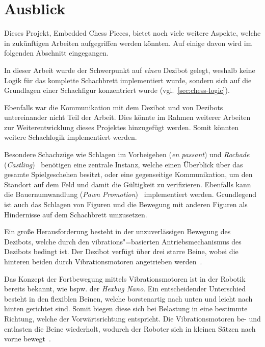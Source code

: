 
\section{Ausblick}
\label{sec:perspective}

Dieses Projekt, Embedded Chess Pieces, bietet noch viele weitere Aspekte, welche in zukünftigen Arbeiten aufgegriffen werden könnten. Auf einige davon wird im folgenden Abschnitt eingegangen.


In dieser Arbeit wurde der Schwerpunkt auf \emph{einen} Dezibot gelegt, weshalb keine Logik für das komplette Schachbrett implementiert wurde, sondern sich auf die Grundlagen einer Schachfigur konzentriert wurde (vgl.~\autoref{sec:chess-logic}).


Ebenfalls war die Kommunikation mit dem Dezibot und von Dezibots untereinander nicht Teil der Arbeit. Dies könnte im Rahmen weiterer Arbeiten zur Weiterentwicklung dieses Projektes hinzugefügt werden. Somit könnten weitere Schachlogik implementiert werden.


Besondere Schachzüge wie Schlagen im Vorbeigehen (\emph{en passant}) und \emph{Rochade} (\emph{Castling})~\cite{justUSChessFederations2019} benötigen eine zentrale Instanz, welche einen Überblick über das gesamte Spielgeschehen besitzt, oder eine gegenseitige Kommunikation, um den Standort auf dem Feld und damit die Gültigkeit zu verifizieren. Ebenfalls kann die Bauernumwandlung (\emph{Pawn Promotion})~\cite{justUSChessFederations2019} implementiert werden. Grundlegend ist auch das Schlagen von Figuren und die Bewegung mit anderen Figuren als Hindernisse auf dem Schachbrett umzusetzen.


Ein große Herausforderung besteht in der unzuverlässigen Bewegung des Dezibots, welche durch den vibrations"=basierten Antriebsmechanismus des Dezibots bedingt ist. Der Dezibot verfügt über drei starre Beine, wobei die hinteren beiden durch Vibrationsmotoren angetrieben werden~\cite{dezibotteamDezibotDezibot2025}.


Das Konzept der Fortbewegung mittels Vibrationsmotoren ist in der Robotik bereits bekannt, wie bspw. der \emph{Hexbug Nano}. Ein entscheidender Unterschied besteht in den flexiblen Beinen, welche borstenartig nach unten und leicht nach hinten gerichtet sind. Somit biegen diese sich bei Belastung in eine bestimmte Richtung, welche der Vorwärtsrichtung entspricht. Die Vibrationsmotoren be- und entlasten die Beine wiederholt, wodurch der Roboter sich in kleinen Sätzen nach vorne bewegt~\cite{normanVehikelInsbesondereSpielzeugRoboter2014}.

